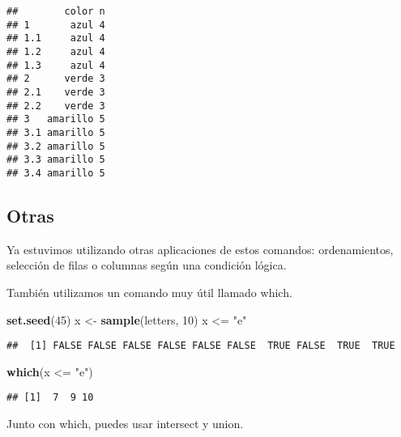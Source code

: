 \documentclass[]{article}
\newenvironment{Shaded}{\begin{snugshade}}{\end{snugshade}}
\newcommand{\KeywordTok}[1]{\textcolor[rgb]{0.13,0.29,0.53}{\textbf{{#1}}}}
\newcommand{\DecValTok}[1]{\textcolor[rgb]{0.00,0.00,0.81}{{#1}}}
\newcommand{\StringTok}[1]{\textcolor[rgb]{0.31,0.60,0.02}{{#1}}}
\newcommand{\NormalTok}[1]{{#1}}
\begin{document}
\begin{verbatim}
##        color n
## 1       azul 4
## 1.1     azul 4
## 1.2     azul 4
## 1.3     azul 4
## 2      verde 3
## 2.1    verde 3
## 2.2    verde 3
## 3   amarillo 5
## 3.1 amarillo 5
## 3.2 amarillo 5
## 3.3 amarillo 5
## 3.4 amarillo 5
\end{verbatim}

\subsection{Otras}\label{otras}

Ya estuvimos utilizando otras aplicaciones de estos comandos:
ordenamientos, selección de filas o columnas según una condición lógica.

También utilizamos un comando muy útil llamado which.

\begin{Shaded}
\begin{Highlighting}[]
\KeywordTok{set.seed}\NormalTok{(}\DecValTok{45}\NormalTok{)}
\NormalTok{x <-}\StringTok{ }\KeywordTok{sample}\NormalTok{(letters, }\DecValTok{10}\NormalTok{)}
\NormalTok{x <=}\StringTok{ "e"}
\end{Highlighting}
\end{Shaded}

\begin{verbatim}
##  [1] FALSE FALSE FALSE FALSE FALSE FALSE  TRUE FALSE  TRUE  TRUE
\end{verbatim}

\begin{Shaded}
\begin{Highlighting}[]
\KeywordTok{which}\NormalTok{(x <=}\StringTok{ "e"}\NormalTok{)}
\end{Highlighting}
\end{Shaded}

\begin{verbatim}
## [1]  7  9 10
\end{verbatim}

Junto con which, puedes usar intersect y union.
\end{document}

